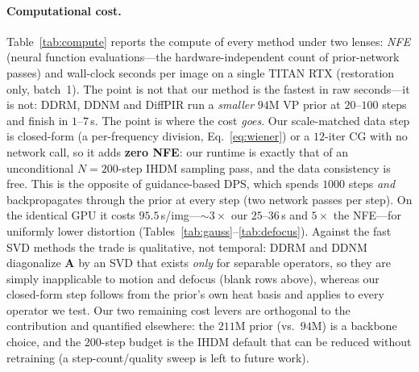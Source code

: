 \documentclass[11pt]{article}
\newcommand{\A}{\mathbf{A}}
\begin{document}
\paragraph{Computational cost.}
Table~\ref{tab:compute} reports the compute of every method under two lenses: \emph{NFE} (neural
function evaluations---the hardware-independent count of prior-network passes) and wall-clock
seconds per image on a single TITAN RTX (restoration only, batch~1). The point is not that our method
is the fastest in raw seconds---it is not: DDRM, DDNM and DiffPIR run a \emph{smaller} $94$M VP prior
at $20$--$100$ steps and finish in $1$--$7$\,s. The point is where the cost \emph{goes}. Our
scale-matched data step is closed-form (a per-frequency division, Eq.~\ref{eq:wiener}) or a $12$-iter
CG with no network call, so it adds \textbf{zero NFE}: our runtime is exactly that of an
unconditional $N{=}200$-step IHDM sampling pass, and the data consistency is free. This is the
opposite of guidance-based DPS, which spends $1000$ steps \emph{and} backpropagates through the prior
at every step (two network passes per step). On the identical GPU it costs $95.5$\,s/img---$\sim\!3\times$
our $25$--$36$\,s and $5\times$ the NFE---for uniformly lower distortion
(Tables~\ref{tab:gauss}--\ref{tab:defocus}). Against the fast SVD methods the trade is qualitative,
not temporal: DDRM and DDNM diagonalize $\A$ by an SVD that exists \emph{only} for separable
operators, so they are simply inapplicable to motion and defocus (blank rows above), whereas our
closed-form step follows from the prior's own heat basis and applies to every operator we test. Our
two remaining cost levers are orthogonal to the contribution and quantified elsewhere: the $211$M
prior (vs.\ $94$M) is a backbone choice, and the $200$-step budget is the IHDM default that can be
reduced without retraining (a step-count/quality sweep is left to future work).
\end{document}
